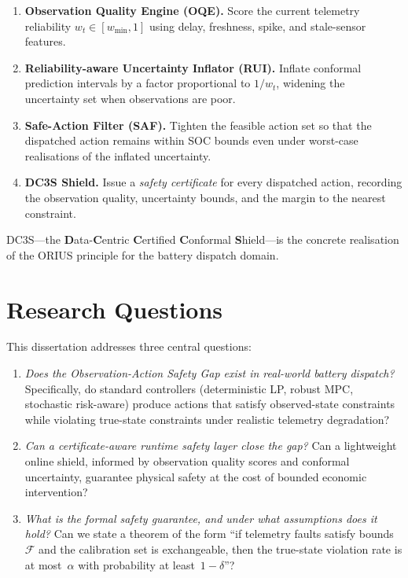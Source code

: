 \begin{enumerate}
  \item \textbf{Observation Quality Engine (OQE).}  Score the current
    telemetry reliability $w_t \in [w_{\min}, 1]$ using delay, freshness,
    spike, and stale-sensor features.
  \item \textbf{Reliability-aware Uncertainty Inflator (RUI).}  Inflate
    conformal prediction intervals by a factor proportional to $1/w_t$,
    widening the uncertainty set when observations are poor.
  \item \textbf{Safe-Action Filter (SAF).}  Tighten the feasible action
    set so that the dispatched action remains within SOC bounds even under
    worst-case realisations of the inflated uncertainty.
  \item \textbf{DC3S Shield.}  Issue a \emph{safety certificate} for
    every dispatched action, recording the observation quality, uncertainty
    bounds, and the margin to the nearest constraint.
\end{enumerate}

DC3S---the \textbf{D}ata-\textbf{C}entric \textbf{C}ertified
\textbf{C}onformal \textbf{S}hield---is the concrete realisation of the
ORIUS principle for the battery dispatch domain.

\section{Research Questions}

This dissertation addresses three central questions:

\begin{enumerate}
  \item[\textbf{RQ1.}] \emph{Does the Observation-Action Safety Gap exist
    in real-world battery dispatch?}  Specifically, do standard controllers
    (deterministic LP, robust MPC, stochastic risk-aware) produce actions
    that satisfy observed-state constraints while violating true-state
    constraints under realistic telemetry degradation?
  \item[\textbf{RQ2.}] \emph{Can a certificate-aware runtime safety layer
    close the gap?}  Can a lightweight online shield, informed by
    observation quality scores and conformal uncertainty, guarantee
    physical safety at the cost of bounded economic intervention?
  \item[\textbf{RQ3.}] \emph{What is the formal safety guarantee, and
    under what assumptions does it hold?}  Can we state a theorem of the
    form ``if telemetry faults satisfy bounds~$\mathcal{F}$ and the
    calibration set is exchangeable, then the true-state violation rate is
    at most~$\alpha$ with probability at least~$1 - \delta$''?
\end{enumerate}


